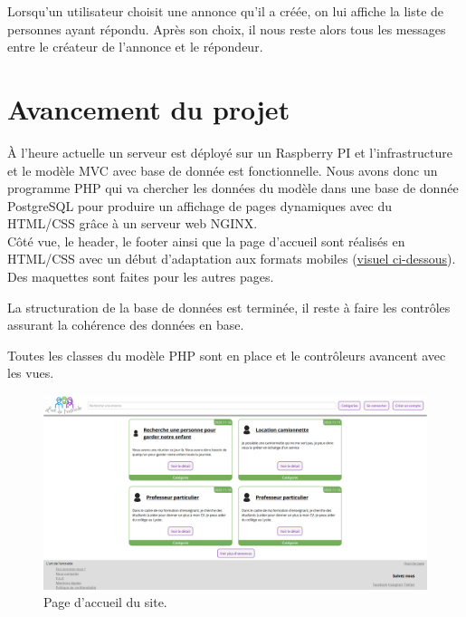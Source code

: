 \documentclass[a4paper,11pt]{article}
\begin{document}
Lorsqu'un utilisateur choisit une annonce qu'il a créée, on lui affiche la liste de personnes ayant répondu. Après son choix, il nous reste alors tous les messages entre le créateur de l'annonce et le répondeur.

\section{Avancement du projet}

À l'heure actuelle un serveur est déployé sur un Raspberry PI et l'infrastructure et le modèle MVC
avec base de donnée est fonctionnelle. Nous avons donc un programme PHP qui va chercher les
données du modèle dans une base de donnée PostgreSQL pour produire un affichage de pages
dynamiques avec du HTML/CSS grâce à un serveur web NGINX.\\

Côté vue, le header, le footer ainsi que la page d'accueil sont réalisés en
HTML/CSS avec un début d'adaptation aux formats mobiles (\underline{\hyperref[fig:page-accueil]{visuel ci-dessous}}). Des maquettes
sont faites pour les autres pages.

La structuration de la base de données est terminée, il reste à faire les contrôles
assurant la cohérence des données en base.

Toutes les classes du modèle PHP sont en place et le contrôleurs avancent avec les vues.

\begin{figure}[H]
  \includegraphics[width=\linewidth]{images/page-accueil.png}
  \caption{Page d'accueil du site.}
  \label{fig:page-accueil}
\end{figure}




\newpage


\end{document}
